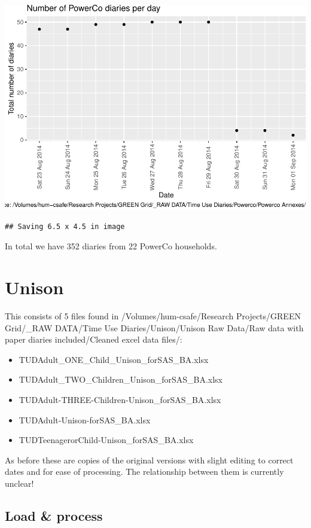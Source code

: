 \documentclass[]{article}
\providecommand{\tightlist}{%
  \setlength{\itemsep}{0pt}\setlength{\parskip}{0pt}}
\begin{document}
\includegraphics{processNZGGTUDData_files/figure-latex/powerCoDiaryPlot-1.pdf}

\begin{verbatim}
## Saving 6.5 x 4.5 in image
\end{verbatim}

In total we have 352 diaries from 22 PowerCo households.

\section{Unison}\label{unison}

This consists of 5 files found in /Volumes/hum-csafe/Research
Projects/GREEN Grid/\_RAW DATA/Time Use Diaries/Unison/Unison Raw
Data/Raw data with paper diaries included/Cleaned excel data files/:

\begin{itemize}
\tightlist
\item
  TUDAdult\_ONE\_Child\_Unison\_forSAS\_BA.xlsx
\item
  TUDAdult\_TWO\_Children\_Unison\_forSAS\_BA.xlsx
\item
  TUDAdult-THREE-Children-Unison\_forSAS\_BA.xlsx
\item
  TUDAdult-Unison-forSAS\_BA.xlsx
\item
  TUDTeenagerorChild-Unison\_forSAS\_BA.xlsx
\end{itemize}

As before these are copies of the original versions with slight editing
to correct dates and for ease of processing. The relationship between
them is currently unclear!

\subsection{Load \& process}\label{load-process-1}
\end{document}
